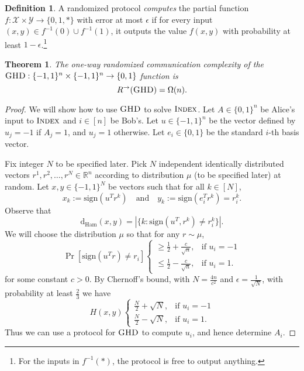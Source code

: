 \documentclass[11pt]{amsart}
\theoremstyle{plain}
\newtheorem{theorem}{Theorem}
\theoremstyle{definition}
\newtheorem{definition}{Definition}
\theoremstyle{plain}
\newcommand{\calX}{\mathcal{X}}
\newcommand{\calY}{\mathcal{Y}}
\newcommand{\dHam}{\mathrm{d}_{\mathrm{Ham}}}
\newcommand{\GHD}{\textsc{GHD}}
\newcommand{\Index}{\textsc{Index}}
\newcommand{\R}{\mathbb{R}}
\begin{document}
\begin{definition}
A randomized protocol \emph{computes} the partial function $f : \calX \times \calY \to \{0,1,*\}$ with error at most $\epsilon$ if for every input $(x,y) \in f^{-1}(0) \cup f^{-1}(1)$, it outputs the value $f(x,y)$ with probability at least $1-\epsilon$.\footnote{For the inputs in $f^{-1}(*)$, the protocol is free to output anything.}
\end{definition}

\begin{theorem}
The one-way randomized communication complexity of the $\GHD : \{-1,1\}^n \times \{-1,1\}^n \to \{0,1\}$ function is
\[
R^\rightarrow(\GHD) = \Omega(n).
\]
\end{theorem}

\begin{proof}
We will show how to use $\GHD$ to solve $\Index$. Let $A\in \{0,1\}^n$ be Alice's input to $\Index$ and $i \in [n]$ be Bob's. Let $u \in \{-1,1\}^n$ be the vector defined by $u_j = -1$ if $A_j = 1$, and $u_j = 1$ otherwise. Let $e_i \in \{0,1\}$ be the standard $i$-th basis vector.

Fix integer $N$ to be specified later. Pick $N$ independent identically distributed vectors $r^1,r^2,\dots, r^N \in \R^n$ according to distribution $\mu$ (to be specified later) at random. Let $x, y\in\{-1,1\}^N$ be vectors such that for all $k \in [N]$,
$$x_k := \text{sign}(u^Tr^k)\quad\text{and}\quad y_k := \text{sign}(e_i^Tr^k) = r^k_i.$$
Observe that
$$\dHam(x,y)= |\{k:\text{sign}(u^T,r^k)\neq r^k_i\}|.$$
We will choose the distribution $\mu$ so that for any $r\sim \mu$,
\begin{equation}\label{eq:prob}\Pr[\text{sign}(u^Tr)\neq r_i] \begin{cases}
\geq \frac{1}{2} + \frac{c}{\sqrt{n}}, &\text{if }u_i=-1 \\
\leq \frac{1}{2}-\frac{c}{\sqrt{n}}, &\text{if }u_i=1.
\end{cases}\end{equation}
for some constant $c>0$. By Chernoff's bound, with $N =\frac{4n}{c^2}$ and $\epsilon = \frac{1}{\sqrt{N}}$, with probability at least $\frac{2}{3}$ we have 
$$H(x,y) \begin{cases}
\frac{N}{2} + \sqrt{N}, &\text{if } u_i = -1 \\
\frac{N}{2} - \sqrt{N}, &\text{if } u_i = 1.
\end{cases}$$
Thus we can use a protocol for $\GHD$ to compute $u_i$, and hence determine $A_i$.


\end{proof}
\end{document}
